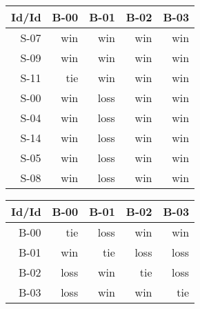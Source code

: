 \begin{tabular}{ | r | r | r | r | r | }
    \hline
        Id/Id  &   B-00  &   B-01  &   B-02  &   B-03  \\
    \hline
    \hline
         S-07  &    win  &    win  &    win  &    win  \\
    \hline
         S-09  &    win  &    win  &    win  &    win  \\
    \hline
         S-11  &    tie  &    win  &    win  &    win  \\
    \hline
         S-00  &    win  &   loss  &    win  &    win  \\
    \hline
         S-04  &    win  &   loss  &    win  &    win  \\
    \hline
         S-14  &    win  &   loss  &    win  &    win  \\
    \hline
         S-05  &    win  &   loss  &    win  &    win  \\
    \hline
         S-08  &    win  &   loss  &    win  &    win  \\
    \hline
\end{tabular}


\begin{tabular}{ | r | r | r | r | r | }
    \hline
        Id/Id  &   B-00  &   B-01  &   B-02  &   B-03  \\
    \hline
    \hline
         B-00  &    tie  &   loss  &    win  &    win  \\
    \hline
         B-01  &    win  &    tie  &   loss  &   loss  \\
    \hline
         B-02  &   loss  &    win  &    tie  &   loss  \\
    \hline
         B-03  &   loss  &    win  &    win  &    tie  \\
    \hline
\end{tabular}




